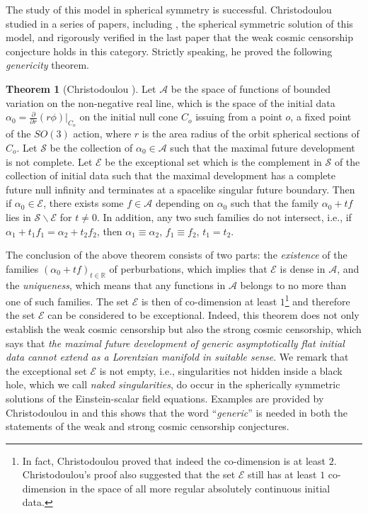 \documentclass[11pt,reqno]{amsart}
\theoremstyle{definition}
\newtheorem{theorem}{Theorem}[section]
\numberwithin{equation}{section}
\begin{document}
The study of this model in spherical symmetry is successful. Christodoulou studied in a series of papers, including \cite{Chr87, Chr91, Chr93, Chr94, Chr99}, the spherical symmetric solution of this model, and rigorously verified in the last paper \cite{Chr99} that the weak cosmic censorship conjecture holds in this category. Strictly speaking, he proved the following \emph{genericity} theorem.
\begin{theorem}[Christodoulou \cite{Chr87, Chr91, Chr93, Chr99}]\label{Christodoulougenericity}
Let $\mathcal{A}$ be the space of functions of bounded variation on the non-negative real line, which is the space of the initial data $\alpha_0=\frac{\partial}{\partial r}(r\phi)\Big|_{C_o}$ on the initial null cone $C_o$ issuing from a point $o$, a fixed point of the $SO(3)$ action, where $r$ is the area radius of the orbit spherical sections of $C_o$. Let $\mathcal{S}$ be the collection of $\alpha_0\in\mathcal{A}$ such that the maximal future development is not complete. Let $\mathcal{E}$ be the exceptional set which is the complement in $\mathcal{S}$ of the collection of initial data such that the maximal development has a complete future null infinity and terminates at a spacelike singular future boundary. Then if $\alpha_0\in\mathcal{E}$, there exists some $f\in\mathcal{A}$ depending on $\alpha_0$ such that the family $\alpha_0+tf$ lies in $\mathcal{S}\backslash\mathcal{E}$ for $t\ne0$. In addition, any two such families do not intersect, i.e., if $\alpha_1+t_1f_1=\alpha_2+t_2f_2$, then $\alpha_1\equiv\alpha_2$, $f_1\equiv f_2$, $t_1=t_2$.
\end{theorem}
The conclusion of the above theorem consists of two parts: the \emph{existence} of the families $(\alpha_0+tf)_{t\in\mathbb{R}}$ of perburbations, which implies that $\mathcal{E}$ is dense in $\mathcal{A}$, and the \emph{uniqueness}, which means that any functions in $\mathcal{A}$ belongs to no more than one of such families. The set $\mathcal{E}$ is then of co-dimension at least $1$\footnote{In fact, Christodoulou proved that indeed the co-dimension is at least $2$. Christodoulou's proof also suggested that the set $\mathcal{E}$ still has at least $1$ co-dimension in the space of all more regular absolutely continuous initial data.} and therefore the set $\mathcal{E}$ can be considered to be exceptional. Indeed, this theorem does not only establish the weak cosmic censorship but also the strong cosmic censorship, which says that \emph{the maximal future development of generic asymptotically flat initial data cannot extend as a Lorentzian manifold in suitable sense}. We remark that the exceptional set $\mathcal{E}$ is not empty, i.e., singularities not hidden inside a black hole, which we call \emph{naked singularities}, do occur in the spherically symmetric solutions of the Einstein-scalar field equations. Examples are provided by Christodoulou in \cite{Chr94} and this shows that the word ``\emph{generic}'' is needed in both the statements of the weak and strong cosmic censorship conjectures.
\end{document}
